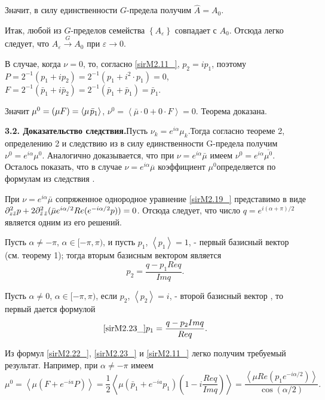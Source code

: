 Значит, в силу единственности $G$-предела получим $\hat{A}=A_{0} $.

Итак, любой из $G$-пределов семейства $\left\{A_{\varepsilon } \right\}$ совпадает с $A_{0} $. Отсюда  легко следует, что $A_{\varepsilon } \stackrel{G}{\longrightarrow} A_{0} $ при $\varepsilon \to 0$.

В случае, когда $\nu =0$, то, согласно \eqref{sirM2.11_}, $p_{2} =ip_{1} $, поэтому $P=2^{-1} (p_{1} +ip_{2} )=2^{-1} (p_{1} +i^{2} \cdot p_{1} )=0$, $F=2^{-1} (\bar{p}_{1} +i\bar{p}_{2} )=2^{-1} (\bar{p}_{1} +\bar{p}_{1} )=\bar{p}_{1} $.

Значит $\mu ^{0} =(\mu F)=\left\langle \mu {\kern 1pt} \bar{p}_{1} \right\rangle $, $\nu ^{0} =\left\langle \bar{\mu }\cdot 0+0\cdot F\right\rangle =0$.  Теорема доказана.

\textbf{3.2. Доказательство следствия.}Пусть $\nu _{k} =e^{i\alpha } \mu _{k} $.Тогда согласно теореме 2, определению 2 и следствию из \cite{Jamaludinova} в силу единственности G-предела получим $\nu ^{0} =e^{i\alpha } \mu ^{0} $. Аналогично доказывается, что при $\nu =e^{i\alpha } \bar{\mu }$ имеем $\nu ^{0} =e^{i\alpha } \overline{\mu ^{0} }$. Осталось показать, что в случае $\nu =e^{i\alpha } \overline{\mu }$ коэффициент $\mu ^{0} $определяется по формулам из следствия .

При $\nu =e^{i\alpha } \bar{\mu }$ сопряженное однородное уравнение \eqref{sirM2.19_} представимо  в виде $\partial _{z\bar{z}}^{2} p+2\partial _{\bar{z}{\kern 1pt} \bar{z}}^{2} (\bar{\mu }e^{i\alpha /2} Re(e^{-i\alpha /2} p))=0$. Отсюда следует, что число $q=e^{i(\alpha +\pi )/2} $ является  одним из его решений.

Пусть $\alpha \ne -\pi $, $\alpha \in [-\pi ,\pi )$, и пусть $p_{1} $,  $\left\langle p_{1} \right\rangle =1$, - первый базисный вектор (см. теорему 1); тогда вторым базисным вектором является
\begin{equation}
\label{sirM2.22_}
p_{2} =\frac{q-p_{1} Req}{Imq}.
\end{equation}

Пусть $\alpha \ne 0$, $\alpha \in [-\pi ,\pi )$,  если  $p_{2} $,  $\left\langle p_{2} \right\rangle =i$, - второй базисный вектор , то первый дается формулой
\begin{equation}
\eqref{sirM2.23_}
p_{1} =\frac{q-p_{2} Imq}{Req}.
\end{equation}

Из формул \eqref{sirM2.22_}, \eqref{sirM2.23_} и \eqref{sirM2.11_} легко получим требуемый результат. Например, при $\alpha \ne -\pi $ имеем
\begin{equation*}
\mu ^{0} =\left\langle \mu (F+e^{-ia} P)\right\rangle =\frac{1}{2} \left\langle \mu (\bar{p}_{1} +e^{-ia} p_{1} )\left(1-i\frac{Req}{Imq} \right)\right\rangle =\frac{\left\langle \mu Re(p_{1} e^{-i\alpha /2} )\right\rangle }{\cos (\alpha /2)}.
\end{equation*}
